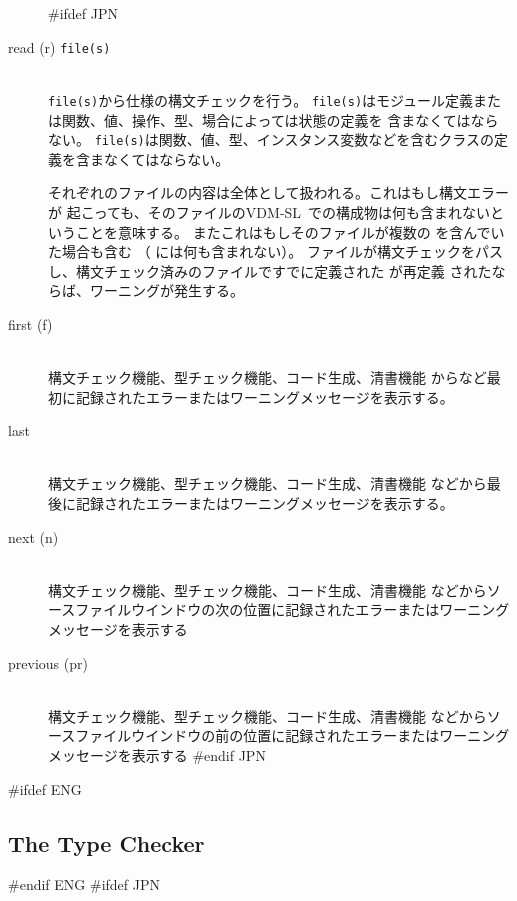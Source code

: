 \documentclass[\pformat,12pt]{article}
\newcommand{\vdmslpp}{VDM-SL}
\newcommand{\vdmslpp}{VDM++}
\begin{document}
\begin{description}
#ifdef JPN
\item[read (r) {\tt file(s)}] \mbox{}\\
  {\tt file(s)}から仕様の構文チェックを行う。
    {
      {\tt file(s)}はモジュール定義または関数、値、操作、型、場合によっては状態の定義を
      含まなくてはならない。
    }%
    {
      {\tt file(s)}は関数、値、型、インスタンス変数などを含むクラスの定義を含まなくてはならない。
    }

  それぞれのファイルの内容は全体として扱われる。これはもし構文エラーが
  起こっても、そのファイルの\vdmslpp\ での構成物は何も含まれないということを意味する。
  またこれはもしそのファイルが複数の
   を含んでいた場合も含む
  （  には何も含まれない）。
  ファイルが構文チェックをパスし、構文チェック済みのファイルですでに定義された
   が再定義
  されたならば、ワーニングが発生する。

\item[first (f)] \mbox{}\\
  構文チェック機能、型チェック機能、コード生成、清書機能
  からなど最初に記録されたエラーまたはワーニングメッセージを表示する。

\item[last] \mbox{}\\
  構文チェック機能、型チェック機能、コード生成、清書機能
  などから最後に記録されたエラーまたはワーニングメッセージを表示する。

\item[next (n) \index{nextコマンド}]\mbox{}\\
  構文チェック機能、型チェック機能、コード生成、清書機能
  などからソースファイルウインドウの次の位置に記録されたエラーまたはワーニングメッセージを表示する

\item[previous (pr)] \mbox{}\\
  構文チェック機能、型チェック機能、コード生成、清書機能
  などからソースファイルウインドウの前の位置に記録されたエラーまたはワーニングメッセージを表示する
#endif JPN

\end{description}

\newpage
#ifdef ENG
\subsection{The Type Checker}\label{sec:tc}
\label{sec:def-typechedk}\label{type check} 
#endif ENG
#ifdef JPN
\end{document}
